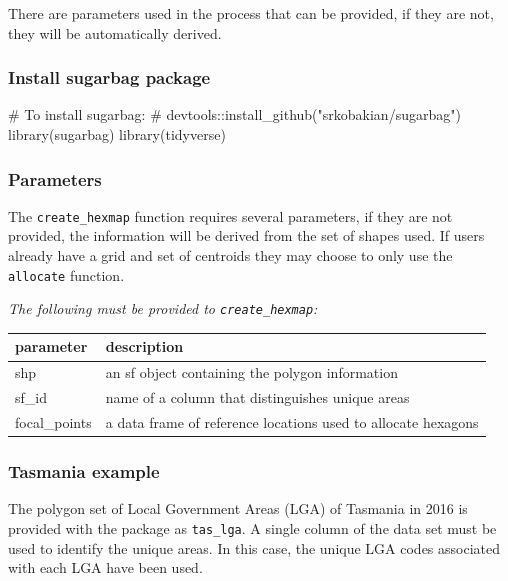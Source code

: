 There are parameters used in the process that can be provided, if they
are not, they will be automatically derived.

\hypertarget{install-sugarbag-package}{%
\subsubsection{Install sugarbag
package}\label{install-sugarbag-package}}

\begin{Schunk}
\begin{Sinput}
# To install sugarbag:
# devtools::install_github("srkobakian/sugarbag")
library(sugarbag)
library(tidyverse)
\end{Sinput}
\end{Schunk}

\hypertarget{parameters}{%
\subsubsection{Parameters}\label{parameters}}

The \texttt{create\_hexmap} function requires several parameters, if
they are not provided, the information will be derived from the
 set of shapes used. If users already have a grid and set of
centroids they may choose to only use the \texttt{allocate} function.

\emph{The following must be provided to \texttt{create\_hexmap}:}

\begin{Schunk}

\begin{tabular}{l|l}
\hline
parameter & description\\
\hline
shp & an sf object containing the polygon information\\
\hline
sf\_id & name of a column that distinguishes unique areas\\
\hline
focal\_points & a data frame of reference locations used to allocate hexagons\\
\hline
\end{tabular}

\end{Schunk}

\hypertarget{tasmania-example}{%
\subsubsection{Tasmania example}\label{tasmania-example}}

The polygon set of Local Government Areas (LGA) of Tasmania in 2016 is
provided with the  package as \texttt{tas\_lga}. A
single column of the data set must be used to identify the unique areas.
In this case, the unique LGA codes associated with each LGA have been
used.


